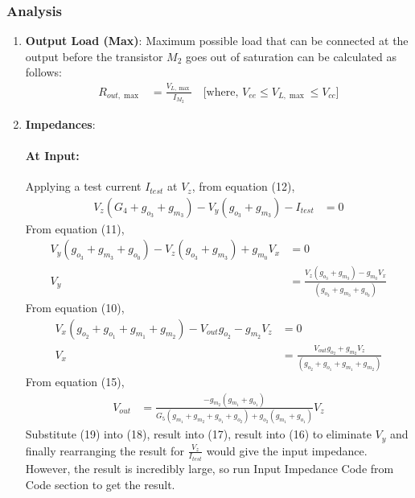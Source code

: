 \subsubsection{Analysis}
\begin{enumerate}
  \item \textbf{Output Load (Max)}: Maximum possible
    load that can be connected at the output before
    the transistor $M_2$ goes out of saturation can
    be calculated as follows:
    \begin{align*}
      R_{out, \max} &= \frac{V_{L, \max}}{I_{M_2}} \quad \text{[where, } V_{ee} \leq V_{L, \max} \leq V_{cc} \text{]}
    \end{align*}
  \item \textbf{Impedances}:
    \paragraph{At Input:}Applying a test current $I_{test}$
      at $V_{z}$, from equation (12),
      \begin{align*}
        V_{z}(G_4 + g_{o_3} + g_{m_3}) - V_{y}(g_{o_3} + g_{m_3}) - I_{test} &= 0 \tag{16}
      \end{align*}
      From equation (11),
      \begin{align*}
        V_{y}(g_{o_3} + g_{m_3} + g_{o_0}) - V_{z}(g_{o_3} + g_{m_3}) + g_{m_0}V_{x} &= 0 \\
        V_{y} &= \frac{V_{z}(g_{o_3} + g_{m_3}) - g_{m_0}V_{x}}{(g_{o_3} + g_{m_3} + g_{o_0})} \tag{17}
      \end{align*}
      From equation (10),
      \begin{align*}
        V_{x}(g_{o_2} + g_{o_1} + g_{m_1} + g_{m_2}) - V_{out}g_{o_2} - g_{m_2}V_{z} &= 0 \\
        V_{x} &= \frac{V_{out}g_{o_2} + g_{m_2}V_{z}}{(g_{o_2} + g_{o_1} + g_{m_1} + g_{m_2})} \tag{18}
      \end{align*}
      From equation (15),
      \begin{align*}
        V_{out} &= \frac{-g_{m_2}(g_{m_1} + g_{o_1})}{G_5(g_{m_1} + g_{m_2} + g_{o_1} + g_{o_2}) + g_{o_2}(g_{m_1} + g_{o_1})} V_{z} \tag{19}
      \end{align*}
      Substitute (19) into (18), result into (17), result into (16)
      to eliminate $V_{y}$ and finally rearranging the result
      for $\frac{V_{z}}{I_{test}}$ would give the input impedance.
      However, the result is incredibly large, so run Input Impedance
      Code from Code section to get the result.

\end{enumerate}

